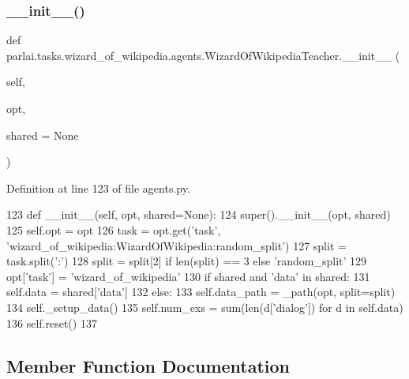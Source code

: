 \subsubsection{\texorpdfstring{\+\_\+\+\_\+init\+\_\+\+\_\+()}{\_\_init\_\_()}}
{\footnotesize\ttfamily def parlai.\+tasks.\+wizard\+\_\+of\+\_\+wikipedia.\+agents.\+Wizard\+Of\+Wikipedia\+Teacher.\+\_\+\+\_\+init\+\_\+\+\_\+ (\begin{DoxyParamCaption}\item[{}]{self,  }\item[{}]{opt,  }\item[{}]{shared = {\ttfamily None} }\end{DoxyParamCaption})}



Definition at line 123 of file agents.\+py.


\begin{DoxyCode}
123     \textcolor{keyword}{def }\_\_init\_\_(self, opt, shared=None):
124         super().\_\_init\_\_(opt, shared)
125         self.opt = opt
126         task = opt.get(\textcolor{stringliteral}{'task'}, \textcolor{stringliteral}{'wizard\_of\_wikipedia:WizardOfWikipedia:random\_split'})
127         split = task.split(\textcolor{stringliteral}{':'})
128         split = split[2] \textcolor{keywordflow}{if} len(split) == 3 \textcolor{keywordflow}{else} \textcolor{stringliteral}{'random\_split'}
129         opt[\textcolor{stringliteral}{'task'}] = \textcolor{stringliteral}{'wizard\_of\_wikipedia'}
130         \textcolor{keywordflow}{if} shared \textcolor{keywordflow}{and} \textcolor{stringliteral}{'data'} \textcolor{keywordflow}{in} shared:
131             self.data = shared[\textcolor{stringliteral}{'data'}]
132         \textcolor{keywordflow}{else}:
133             self.data\_path = \_path(opt, split=split)
134             self.\_setup\_data()
135         self.num\_exs = sum(len(d[\textcolor{stringliteral}{'dialog'}]) \textcolor{keywordflow}{for} d \textcolor{keywordflow}{in} self.data)
136         self.reset()
137 
\end{DoxyCode}


\subsection{Member Function Documentation}
\mbox{\label{classparlai_1_1tasks_1_1wizard__of__wikipedia_1_1agents_1_1WizardOfWikipediaTeacher_acf1161101f1d7d03017da25f976488d6}} 
